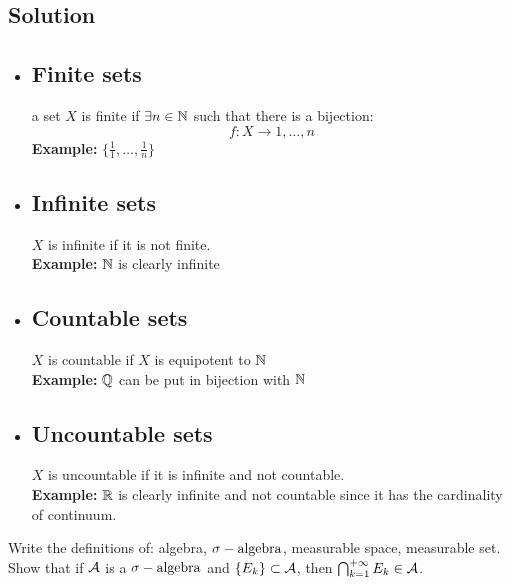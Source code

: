 \subsection*{Solution}
\provdefs
\begin{itemize}
    \item \subsection{Finite sets} a set $X$ is finite if $\exists n\in\mathbb{N}$ such that there is a bijection:
    \[
        f:X\to {1,\dots,n}    
    \]
    \textbf{Example:} $\{\frac{1}{1}, \dots, \frac{1}{n}\}$
    \item \subsection{Infinite sets} $X$ is infinite if it is not finite.\\
    \textbf{Example:} $\mathbb{N}$ is clearly infinite
    \item \subsection{Countable sets} $X$ is countable if $X$ is equipotent to $\mathbb{N}$\\
    \textbf{Example:} $\mathbb{Q}$ can be put in bijection with $\mathbb{N}$
    \item \subsection{Uncountable sets} $X$ is uncountable if it is infinite and not countable.\\
    \textbf{Example:} $\mathbb{R}$ is clearly infinite and not countable since it has the cardinality of continuum.
\end{itemize}


\question
Write the definitions of: algebra, $\sigma-\text{algebra}$, measurable space, measurable set. Show that if $\mathcal{A}$
is a $\sigma-\text{algebra}$ and $\{E_k\}\subset \mathcal{A}$, then $\bigcap^{+\infty}_{k=1} E_k \in \mathcal{A} $.

